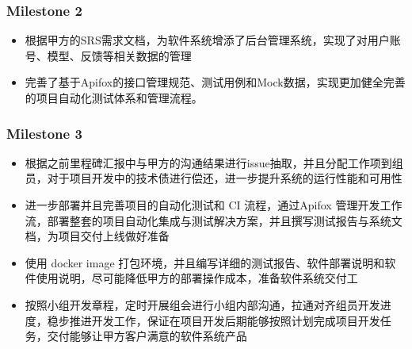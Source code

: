 \begin{frame}
    \frametitle{Milestone 2}
    \begin{itemize}
        \item 根据甲方的SRS需求文档，为软件系统增添了后台管理系统，实现了对用户账号、模型、反馈等相关数据的管理
        \item 完善了基于Apifox的接口管理规范、测试用例和Mock数据，实现更加健全完善的项目自动化测试体系和管理流程。
    \end{itemize}
\end{frame}

\begin{frame}
    \frametitle{Milestone 3}
    \begin{itemize}
        \item 根据之前里程碑汇报中与甲方的沟通结果进行issue抽取，并且分配工作项到组员，对于项目开发中的技术债进行偿还，进一步提升系统的运行性能和可用性
        \item 进一步部署并且完善项目的自动化测试和 CI 流程，通过Apifox 管理开发工作流，部署整套的项目自动化集成与测试解决方案，并且撰写测试报告与系统文档，为项目交付上线做好准备
        \item 使用 docker image 打包环境，并且编写详细的测试报告、软件部署说明和软件使用说明，尽可能降低甲方的部署操作成本，准备软件系统交付工
        \item 按照小组开发章程，定时开展组会进行小组内部沟通，拉通对齐组员开发进度，稳步推进开发工作，保证在项目开发后期能够按照计划完成项目开发任务，交付能够让甲方客户满意的软件系统产品
    \end{itemize}
\end{frame}

